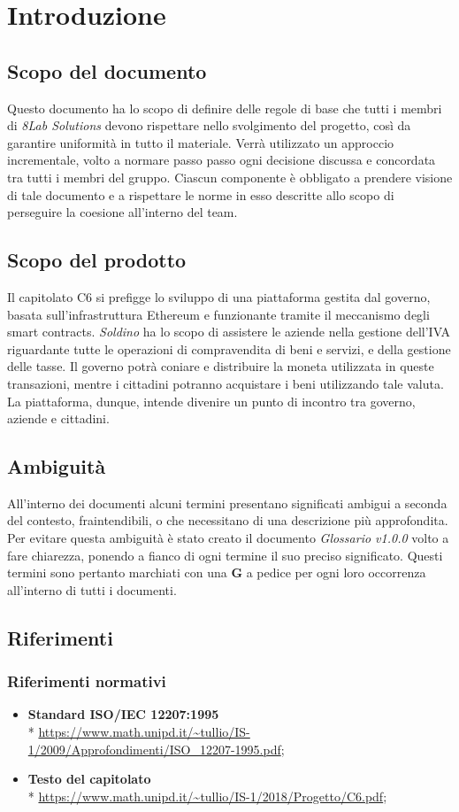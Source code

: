 \section{Introduzione}
\subsection{Scopo del documento}
Questo documento ha lo scopo di definire delle regole di base che tutti i membri di \textit{8Lab Solutions} devono rispettare nello svolgimento del progetto, così da garantire uniformità in tutto il materiale. Verrà utilizzato un approccio incrementale, volto a normare passo passo ogni decisione discussa e concordata tra tutti i membri del gruppo. Ciascun componente è obbligato a prendere visione di tale documento e a rispettare le norme in esso descritte allo scopo di perseguire la coesione all'interno del team.
\subsection{Scopo del prodotto}
Il capitolato C6 si prefigge lo sviluppo di una piattaforma gestita dal governo, basata sull'infrastruttura Ethereum\glo{} e funzionante tramite il meccanismo degli smart contracts\glo{}. \textit{Soldino} ha lo scopo di assistere le aziende nella gestione dell'IVA riguardante tutte le operazioni di compravendita di beni e servizi, e della gestione delle tasse. Il governo potrà coniare e distribuire la moneta utilizzata in queste transazioni, mentre i cittadini potranno acquistare i beni utilizzando tale valuta. La piattaforma, dunque, intende divenire un punto di incontro tra governo, aziende e cittadini.
\subsection{Ambiguità}
All'interno dei documenti alcuni termini presentano significati ambigui  a  seconda del contesto, fraintendibili, o che necessitano di una descrizione più approfondita. Per evitare questa ambiguità è stato creato il documento \textit{Glossario v1.0.0} volto a fare chiarezza, ponendo a fianco di ogni termine il suo preciso significato. Questi termini sono pertanto marchiati con una \textbf{G} a pedice per ogni loro occorrenza all'interno di tutti i documenti.
\subsection{Riferimenti}
\subsubsection{Riferimenti normativi}
\begin{itemize}
\item \textbf{Standard ISO/IEC 12207:1995} \\* 
\url{https://www.math.unipd.it/~tullio/IS-1/2009/Approfondimenti/ISO_12207-1995.pdf};
\item \textbf{Testo del capitolato} \\*  \url{https://www.math.unipd.it/~tullio/IS-1/2018/Progetto/C6.pdf};
\end{itemize}
